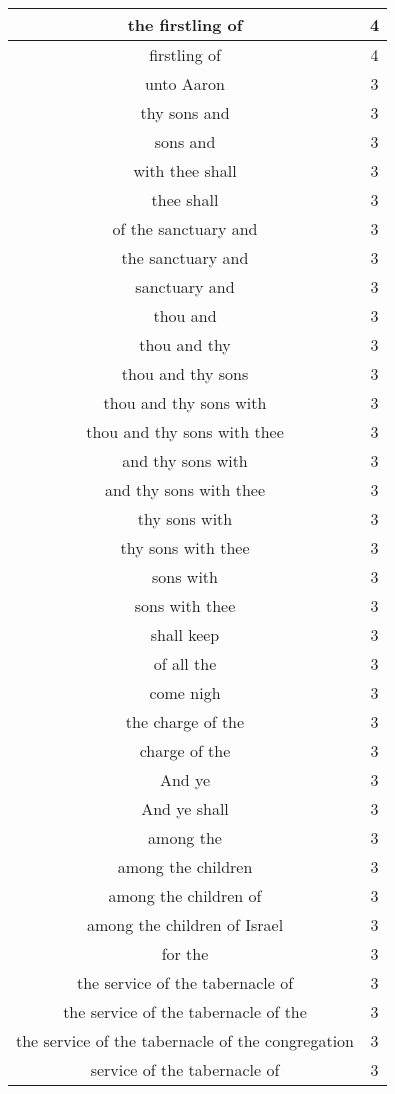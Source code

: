 \begin{center}
\begin{longtable}{|c|c|}
the firstling of & 4\\ \hline 
firstling of & 4\\ \hline 
unto Aaron & 3\\ \hline 
thy sons and & 3\\ \hline 
sons and & 3\\ \hline 
with thee shall & 3\\ \hline 
thee shall & 3\\ \hline 
of the sanctuary and & 3\\ \hline 
the sanctuary and & 3\\ \hline 
sanctuary and & 3\\ \hline 
thou and & 3\\ \hline 
thou and thy & 3\\ \hline 
thou and thy sons & 3\\ \hline 
thou and thy sons with & 3\\ \hline 
thou and thy sons with thee & 3\\ \hline 
and thy sons with & 3\\ \hline 
and thy sons with thee & 3\\ \hline 
thy sons with & 3\\ \hline 
thy sons with thee & 3\\ \hline 
sons with & 3\\ \hline 
sons with thee & 3\\ \hline 
shall keep & 3\\ \hline 
of all the & 3\\ \hline 
come nigh & 3\\ \hline 
the charge of the & 3\\ \hline 
charge of the & 3\\ \hline 
And ye & 3\\ \hline 
And ye shall & 3\\ \hline 
among the & 3\\ \hline 
among the children & 3\\ \hline 
among the children of & 3\\ \hline 
among the children of Israel & 3\\ \hline 
for the & 3\\ \hline 
the service of the tabernacle of & 3\\ \hline 
the service of the tabernacle of the & 3\\ \hline 
the service of the tabernacle of the congregation & 3\\ \hline 
service of the tabernacle of & 3\\ \hline 

\end{longtable}
\end{center}
